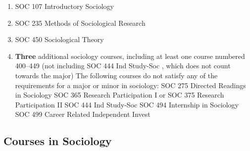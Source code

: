 \documentclass[
  letterpaper,
]{scrbook}
\begin{document}
\begin{enumerate}
\def\labelenumi{\arabic{enumi}.}
\item
  SOC 107 Introductory Sociology
\item
  SOC 235 Methods of Sociological Research
\item
  SOC 450 Sociological Theory
\item
  \textbf{Three} additional sociology courses, including at least one
  course numbered 400--449 (not including SOC 444 Ind Study-Soc , which
  does not count towards the major) The following courses do not satisfy
  any of the requirements for a major or minor in sociology: SOC 275
  Directed Readings in Sociology SOC 365 Research Participation I or SOC
  375 Research Participation II SOC 444 Ind Study-Soc SOC 494 Internship
  in Sociology SOC 499 Career Related Independent Invest
\end{enumerate}

\hypertarget{courses-in-sociology}{%
\subsection{Courses in Sociology}\label{courses-in-sociology}}
\end{document}
